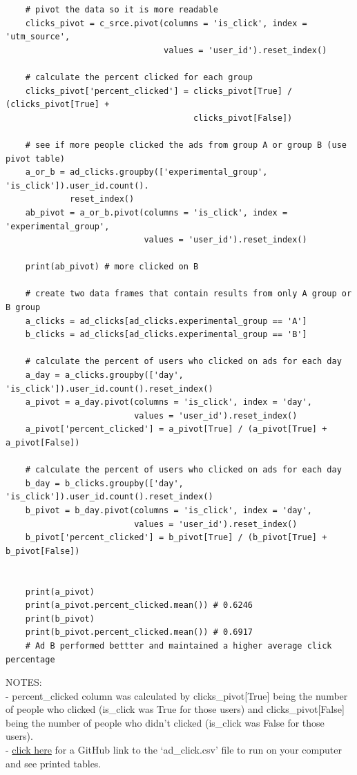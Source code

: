 \documentclass[11pt, a4paper]{article}
\begin{document}
\begin{spacing}{1.1}
\begin{lstlisting}
	# pivot the data so it is more readable
	clicks_pivot = c_srce.pivot(columns = 'is_click', index = 'utm_source', 
	                            values = 'user_id').reset_index()
	
	# calculate the percent clicked for each group
	clicks_pivot['percent_clicked'] = clicks_pivot[True] / (clicks_pivot[True] + 
	                                  clicks_pivot[False])
	
	# see if more people clicked the ads from group A or group B (use pivot table)
	a_or_b = ad_clicks.groupby(['experimental_group', 'is_click']).user_id.count().
	         reset_index()
	ab_pivot = a_or_b.pivot(columns = 'is_click', index = 'experimental_group', 
                            values = 'user_id').reset_index()
	
	print(ab_pivot) # more clicked on B
	
	# create two data frames that contain results from only A group or B group
	a_clicks = ad_clicks[ad_clicks.experimental_group == 'A']
	b_clicks = ad_clicks[ad_clicks.experimental_group == 'B']
	
	# calculate the percent of users who clicked on ads for each day
	a_day = a_clicks.groupby(['day', 'is_click']).user_id.count().reset_index()
	a_pivot = a_day.pivot(columns = 'is_click', index = 'day', 
	                      values = 'user_id').reset_index()
	a_pivot['percent_clicked'] = a_pivot[True] / (a_pivot[True] + a_pivot[False])
	
	# calculate the percent of users who clicked on ads for each day
	b_day = b_clicks.groupby(['day', 'is_click']).user_id.count().reset_index()
	b_pivot = b_day.pivot(columns = 'is_click', index = 'day', 
	                      values = 'user_id').reset_index()
	b_pivot['percent_clicked'] = b_pivot[True] / (b_pivot[True] + b_pivot[False])
	
	
	print(a_pivot)
	print(a_pivot.percent_clicked.mean()) # 0.6246
	print(b_pivot)
	print(b_pivot.percent_clicked.mean()) # 0.6917 
	# Ad B performed bettter and maintained a higher average click percentage \end{lstlisting}\vspace*{3mm}
	NOTES: \\
	- percent\_clicked column was calculated by clicks\_pivot[True] being the number of people who clicked \hspace*{2mm} (is\_click was True for those users) and clicks\_pivot[False] being the number of people who didn't clicked \hspace*{2mm} (is\_click was False for those users). \vspace*{4mm} \\
	- \href{https://github.com/strongdan/intro-data-analysis-codecademy/blob/master/ad_clicks.csv}{click here} for a GitHub link to the `ad\_click.csv' file to run on your computer and see printed tables. \newpage 
	

\end{spacing}
\end{document}
